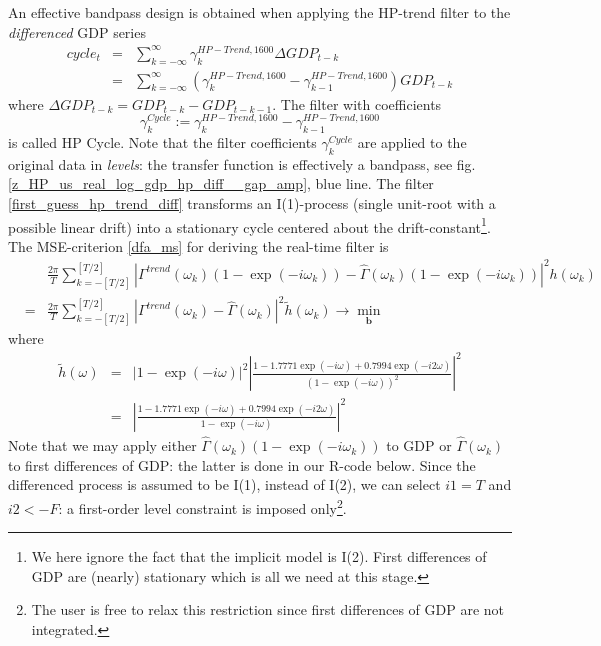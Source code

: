 \documentclass[a4paper]{book}
\begin{document}
An effective bandpass design is obtained when applying the HP-trend filter to the \emph{differenced} GDP series
\begin{eqnarray*}
cycle_t&=&\sum_{k=-\infty}^{\infty}{\gamma}_k^{HP-Trend,1600} \Delta GDP_{t-k}\\
&=&\sum_{k=-\infty}^{\infty}({\gamma}_{k}^{HP-Trend,1600}-{\gamma}_{k-1}^{HP-Trend,1600}) GDP_{t-k}
\end{eqnarray*}
where $\Delta GDP_{t-k}=GDP_{t-k}-GDP_{t-k-1}$. The filter with coefficients
\begin{equation}\label{first_guess_hp_trend_diff}
\gamma_k^{Cycle}:={\gamma}_{k}^{HP-Trend,1600}-{\gamma}_{k-1}^{HP-Trend,1600}
\end{equation}
is called HP Cycle. Note that the filter coefficients $\gamma_k^{Cycle}$ are applied to the original data in \emph{levels}: the transfer function is effectively a bandpass, see fig.\ref{z_HP_us_real_log_gdp_hp_diff__gap_amp}, blue line. The filter \ref{first_guess_hp_trend_diff} transforms an I(1)-process (single unit-root with a possible linear drift) into a stationary cycle centered about the drift-constant\footnote{We here ignore the fact that the implicit model is I(2). First differences of GDP are (nearly) stationary which is all we need at this stage.}. The MSE-criterion \ref{dfa_ms} for deriving the real-time filter is
\begin{eqnarray}
&&\frac{2\pi}{T}\sum_{k=-[T/2]}^{[T/2]}\left|\Gamma^{trend}(\omega_k)(1-\exp(-i\omega_k))-\hat{\Gamma}(\omega_k)(1-\exp(-i\omega_k)) \right|^2 h(\omega_k)\nonumber\\
&=&\frac{2\pi}{T}\sum_{k=-[T/2]}^{[T/2]}\left|\Gamma^{trend}(\omega_k)-\hat{\Gamma}(\omega_k) \right|^2 \tilde{h}(\omega_k)\to\min_{\mathbf{b}}\label{dfa_ms_hp_cycle}
\end{eqnarray}
where 
\begin{eqnarray}
\tilde{h}(\omega)&=&\left|1-\exp(-i\omega)\right|^2\left|\frac{1-1.7771\exp(-i\omega)+0.7994\exp(-i2\omega)}{(1-\exp(-i\omega))^2}\right|^2\nonumber\\
&=&\left|\frac{1-1.7771\exp(-i\omega)+0.7994\exp(-i2\omega)}{1-\exp(-i\omega)}\right|^2\label{hp_pseudo_spec_diff}
\end{eqnarray}
Note that we may apply either $\hat{\Gamma}(\omega_k)(1-\exp(-i\omega_k))$ to GDP or $\hat{\Gamma}(\omega_k)$ to first differences of GDP: the latter is done in our R-code below. 
Since the differenced process is assumed to be I(1), instead of I(2), we can select $i1=T$ and $i2<-F$: a first-order level constraint is imposed only\footnote{The user is free to relax this restriction since first differences of GDP are not integrated.}.\\
\end{document}
